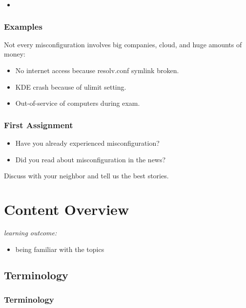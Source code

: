 {\begin{frame}
\begin{itemize}
		\item   \textcolor{white}{}
			\textcolor{white}{}
	\end{itemize}
\end{frame}
\begin{frame}
	\frametitle{Examples}
	Not every misconfiguration involves big companies, cloud, and huge amounts of money:
	\begin{itemize}
		\item No internet access because resolv.conf symlink broken.
		\item KDE crash because of ulimit setting.
		\item Out-of-service of computers during exam.
	\end{itemize}
\end{frame}
}
\begin{assignment}
	\frametitle{First Assignment}
	\begin{itemize}
		\item Have you already experienced misconfiguration?
		\item Did you read about misconfiguration in the news?
	\end{itemize}
	\begin{task}
	Discuss with your neighbor and tell us the best stories.
	\end{task}
\end{assignment}

\section{Content Overview}

\begin{frame}
	\textit{learning outcome:}
	\begin{itemize}
		\item being familiar with the topics
	\end{itemize}
\end{frame}

\subsection{Terminology}
\begin{frame}
	\frametitle{Terminology}
	
\end{frame}

